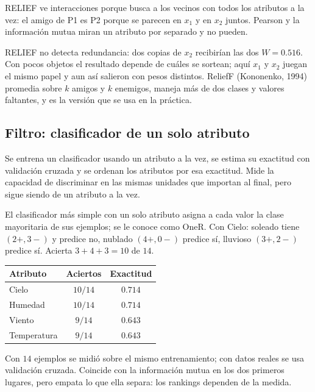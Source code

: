 \documentclass[11pt,letterpaper]{article}
\begin{document}
\begin{idea}
    RELIEF ve interacciones porque busca a los vecinos con todos los
    atributos a la vez: el amigo de P1 es P2 porque se parecen en $x_1$
    y en $x_2$ juntos. Pearson y la información mutua miran un atributo
    por separado y no pueden.
\end{idea}

\begin{ojo}
    RELIEF no detecta redundancia: dos copias de $x_2$ recibirían las
    dos $W = 0.516$. Con pocos objetos el resultado depende de cuáles
    se sortean; aquí $x_1$ y $x_2$ juegan el mismo papel y aun así
    salieron con pesos distintos. ReliefF (Kononenko, 1994) promedia
    sobre $k$ amigos y $k$ enemigos, maneja más de dos clases y valores
    faltantes, y es la versión que se usa en la práctica.
\end{ojo}


\subsection*{Filtro: clasificador de un solo atributo}

Se entrena un clasificador usando un atributo a la vez, se estima su
exactitud con validación cruzada y se ordenan los atributos por esa
exactitud. Mide la capacidad de discriminar en las mismas unidades que
importan al final, pero sigue siendo de un atributo a la vez.

\begin{ejemplo}
    El clasificador más simple con un solo atributo asigna a cada valor
    la clase mayoritaria de sus ejemplos; se le conoce como OneR. Con
    Cielo: soleado tiene $(2+, 3-)$ y predice no, nublado $(4+, 0-)$
    predice sí, lluvioso $(3+, 2-)$ predice sí. Acierta $3 + 4 + 3 = 10$
    de $14$.
    \begin{center}
    \small
    \begin{tabular}{lcc}
        \toprule
        \textbf{Atributo} & \textbf{Aciertos} & \textbf{Exactitud} \\
        \midrule
        Cielo       & $10/14$ & $0.714$ \\
        Humedad     & $10/14$ & $0.714$ \\
        Viento      & $9/14$  & $0.643$ \\
        Temperatura & $9/14$  & $0.643$ \\
        \bottomrule
    \end{tabular}
    \end{center}
    Con $14$ ejemplos se midió sobre el mismo entrenamiento; con datos
    reales se usa validación cruzada. Coincide con la información mutua
    en los dos primeros lugares, pero empata lo que ella separa: los
    rankings dependen de la medida.
\end{ejemplo}
\end{document}
